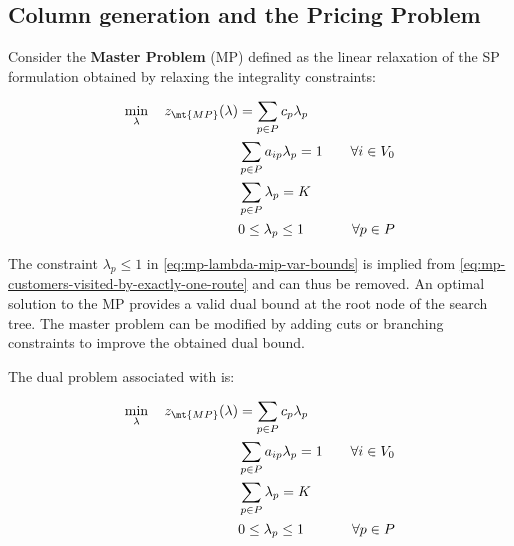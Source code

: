 \subsection{Column generation and the Pricing Problem}
\label{sec:column-generation-and-pricing-problem}

Consider the \textbf{Master Problem} (MP) defined
as the linear relaxation of the SP formulation obtained by relaxing the integrality constraints:

\begin{align}
	\min_{\lambda} \quad z_\mt{MP}(\lambda) & = \sum_{p \in P}  c_p \lambda_p \label{eq:mp-obj-func}                                                                                                                             \\
	                                        & \sum_{p \in P}  a_{ip} \lambda_p = 1                   & \quad \forall i \in V_0                                              \label{eq:mp-customers-visited-by-exactly-one-route} \\
	                                        & \sum_{p \in P} \lambda_{p} = K\label{eq:mp-K-routes}                                                                                                                               \\
	                                        & 0 \le \lambda_p \le 1                                  & \quad \forall p \in P \label{eq:mp-lambda-mip-var-bounds}
\end{align}


The constraint $\lambda_p \le 1$ in \cref{eq:mp-lambda-mip-var-bounds} is implied from \cref{eq:mp-customers-visited-by-exactly-one-route} and can thus be removed.
An optimal solution to the MP provides a valid dual bound at the root node of the search tree.
The master problem can be modified by adding cuts or branching constraints to improve the obtained dual bound.

The dual problem associated with 
is:

\begin{align}
	\min_{\lambda} \quad z_\mt{MP}(\lambda) & = \sum_{p \in P}  c_p \lambda_p \label{eq:mp-obj-func}                                                                                                                             \\
	                                        & \sum_{p \in P}  a_{ip} \lambda_p = 1                   & \quad \forall i \in V_0                                              \label{eq:mp-customers-visited-by-exactly-one-route} \\
	                                        & \sum_{p \in P} \lambda_{p} = K\label{eq:mp-K-routes}                                                                                                                               \\
	                                        & 0 \le \lambda_p \le 1                                  & \quad \forall p \in P \label{eq:mp-lambda-mip-var-bounds}
\end{align}




